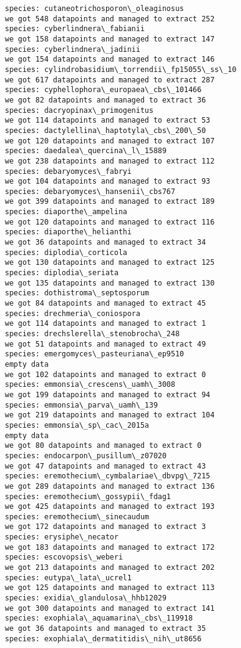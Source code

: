 \documentclass[11pt]{article}
\begin{document}
\begin{Verbatim}[commandchars=\\\{\}]
species: cutaneotrichosporon\_oleaginosus
we got 548 datapoints and managed to extract 252
species: cyberlindnera\_fabianii
we got 158 datapoints and managed to extract 147
species: cyberlindnera\_jadinii
we got 154 datapoints and managed to extract 146
species: cylindrobasidium\_torrendii\_fp15055\_ss\_10
we got 617 datapoints and managed to extract 287
species: cyphellophora\_europaea\_cbs\_101466
we got 82 datapoints and managed to extract 36
species: dacryopinax\_primogenitus
we got 114 datapoints and managed to extract 53
species: dactylellina\_haptotyla\_cbs\_200\_50
we got 120 datapoints and managed to extract 107
species: daedalea\_quercina\_l\_15889
we got 238 datapoints and managed to extract 112
species: debaryomyces\_fabryi
we got 104 datapoints and managed to extract 93
species: debaryomyces\_hansenii\_cbs767
we got 399 datapoints and managed to extract 189
species: diaporthe\_ampelina
we got 120 datapoints and managed to extract 116
species: diaporthe\_helianthi
we got 36 datapoints and managed to extract 34
species: diplodia\_corticola
we got 130 datapoints and managed to extract 125
species: diplodia\_seriata
we got 135 datapoints and managed to extract 130
species: dothistroma\_septosporum
we got 84 datapoints and managed to extract 45
species: drechmeria\_coniospora
we got 114 datapoints and managed to extract 1
species: drechslerella\_stenobrocha\_248
we got 51 datapoints and managed to extract 49
species: emergomyces\_pasteuriana\_ep9510
empty data
we got 102 datapoints and managed to extract 0
species: emmonsia\_crescens\_uamh\_3008
we got 199 datapoints and managed to extract 94
species: emmonsia\_parva\_uamh\_139
we got 219 datapoints and managed to extract 104
species: emmonsia\_sp\_cac\_2015a
empty data
we got 80 datapoints and managed to extract 0
species: endocarpon\_pusillum\_z07020
we got 47 datapoints and managed to extract 43
species: eremothecium\_cymbalariae\_dbvpg\_7215
we got 289 datapoints and managed to extract 136
species: eremothecium\_gossypii\_fdag1
we got 425 datapoints and managed to extract 193
species: eremothecium\_sinecaudum
we got 172 datapoints and managed to extract 3
species: erysiphe\_necator
we got 183 datapoints and managed to extract 172
species: escovopsis\_weberi
we got 213 datapoints and managed to extract 202
species: eutypa\_lata\_ucrel1
we got 125 datapoints and managed to extract 113
species: exidia\_glandulosa\_hhb12029
we got 300 datapoints and managed to extract 141
species: exophiala\_aquamarina\_cbs\_119918
we got 36 datapoints and managed to extract 35
species: exophiala\_dermatitidis\_nih\_ut8656

\end{Verbatim}
\end{document}
